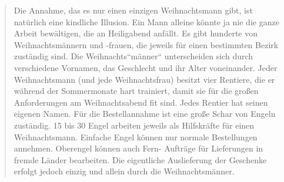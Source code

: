 \begin{quotation}
\noindent Die Annahme, das es nur einen einzigen Weihnachtsmann gibt, ist
natürlich eine kindliche Illusion. Ein Mann alleine könnte ja nie die ganze
Arbeit bewältigen, die an Heiligabend anfällt. Es gibt hunderte von
Weihnachtsmännern und -frauen, die jeweils für einen bestimmten Bezirk
zuständig sind. Die Weihnachts“männer“ unterscheiden sich durch verschiedene
Vornamen, das Geschlecht und ihr Alter voneinander. Jeder Weihnachtsmann (und
jede Weihnachtsfrau) besitzt vier Rentiere, die er während der Sommermonate
hart trainiert, damit sie für die großen Anforderungen am Weihnachtsabend fit
sind. Jedes Rentier hat seinen eigenen Namen. Für die Bestellannahme ist eine
große Schar von Engeln zuständig. 15 bis 30 Engel arbeiten jeweils als
Hilfskräfte für einen Weihnachtsmann. Einfache Engel können nur normale
Bestellungen annehmen. Oberengel können auch Fern- Aufträge für Lieferungen in
fremde Länder bearbeiten. Die eigentliche Auslieferung der Geschenke erfolgt
jedoch einzig und allein durch die Weihnachtsmänner.
\end{quotation}
